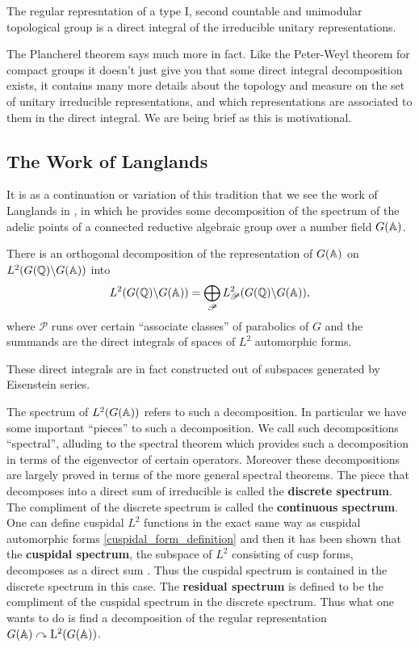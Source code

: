 \begin{Theorem}
	The regular represntation of a type I, second countable and unimodular topological group is a direct integral of the irreducible unitary representations. 
\end{Theorem}
\begin{remark}
	The Plancherel theorem says much more in fact. Like the Peter-Weyl theorem for compact groups it doesn't just give you that some direct integral decomposition exists, it contains many more details about the topology and measure on the set of unitary irreducible representations, and which representations are associated to them in the direct integral. We are being brief as this is motivational.
\end{remark}



\subsection{The Work of Langlands}
It is as a continuation or variation of this tradition that we see the work of Langlands in \cite{langlandsFunctionalEquationsSatisfied1976}, in which he provides some decomposition of the spectrum of the adelic points of a connected reductive algebraic group over a number field \(G(\A)\).

\begin{Theorem}
	There is an orthogonal decomposition of the representation of \(G(\A)\) on \(L^2(G(\Q) \backslash G(\A))\) into 
	\[L^2(G(\Q) \backslash G(\A)) = \bigoplus_{\mathscr{P}}L^2_\mathscr{P}(G(\Q) \backslash G(\A)),\]
	where \(\mathscr{P}\) runs over certain ``associate classes'' of parabolics of \(G\) and the summands are the direct integrals of spaces of \(L^2\) automorphic forms.
\end{Theorem}
These direct integrals are in fact constructed out of subspaces generated by Eisenstein series. 

The spectrum of \(L^2(G(\A))\) refers to such a decomposition. In particular we have some important ``pieces'' to such a decomposition. We call such decompositions ``spectral'', alluding to the spectral theorem which provides such a decomposition in terms of the eigenvector of certain operators. Moreover these decompositions are largely proved in terms of the more general spectral theorems. The piece that decomposes into a direct sum of irreducible is called the \textbf{discrete spectrum}. The compliment of the discrete spectrum is called the \textbf{continuous spectrum}. One can define cuspidal \(L^2\) functions in the exact same way as cuspidal automorphic forms \ref{cuspidal_form_definition} and then it has been shown that the \textbf{cuspidal spectrum}, the subspace of \(L^2\) consisting of cusp forms, decomposes as a direct sum \cite[9]{getzIntroductionAutomorphicRepresentations2024}. Thus the cuspidal spectrum is contained in the discrete spectrum in this case. The \textbf{residual spectrum} is defined to be the compliment of the cuspidal spectrum in the discrete spectrum. Thus what one wants to do is find a decomposition of the regular representation \(G(\A) \curvearrowright \mathrm{L}^2(G(\A))\).

